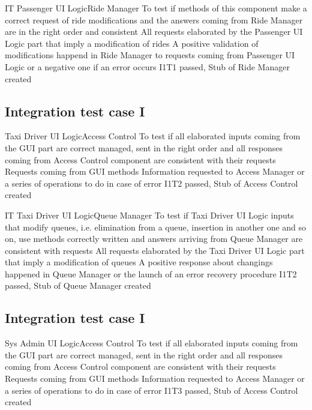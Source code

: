 \vspace{2ex}
\tctable
{IT}
{Passenger UI Logic\textrightarrow Ride Manager}
{To test if methods of this component make a correct request of ride modifications and the answers coming from Ride Manager are in the right order and consistent}
{All requests elaborated by the Passenger UI Logic part that imply a modification of rides}
{A positive validation of modifications happend in Ride Manager to requests coming from Passenger UI Logic or a negative one if an error occurs}
{I1T1 passed, Stub of Ride Manager created}


\subsection{Integration test case I}
\setcounter{testcounter}{1}
{Taxi Driver UI Logic\textrightarrow Access Control}
{To test if all elaborated inputs coming from the GUI part are correct managed, sent in the right order and all responses coming from Access Control component are consistent with their requests}
{Requests coming from GUI methods}
{Information requested to Access Manager or a series of operations to do in case of error}
{I1T2 passed, Stub of Access Control created}

\vspace{2ex}
\tctable
{IT}
{Taxi Driver UI Logic\textrightarrow Queue Manager}
{To test if Taxi Driver UI Logic inputs that modify queues, i.e. elimination from a queue, insertion in another one and so on, use methods correctly written and answers arriving from Queue Manager are consistent with requests}
{All requests elaborated by the Taxi Driver UI Logic part that imply a modification of queues}
{A positive response about changings happened in Queue Manager or the launch of an error recovery procedure}
{I1T2 passed, Stub of Queue Manager created}


\subsection{Integration test case I}
\setcounter{testcounter}{1}
{Sys Admin UI Logic\textrightarrow Access Control}
{To test if all elaborated inputs coming from the GUI part are correct managed, sent in the right order and all responses coming from Access Control component are consistent with their requests}
{Requests coming from GUI methods}
{Information requested to Access Manager or a series of operations to do in case of error}
{I1T3 passed, Stub of Access Control created}

